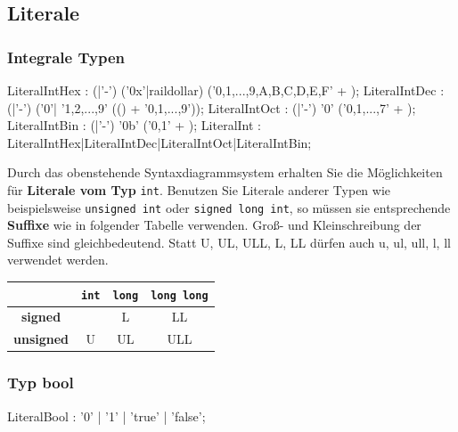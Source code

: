 \documentclass[a4paper]{report}
\begin{document}
\subsection{Literale}

\subsubsection{Integrale Typen}

\begin{center}
\begin{mdframed}[rightmargin=70pt, leftmargin=70pt, linewidth= 0pt]

\begin{rail}
	LiteralIntHex : (|'-') ('0x'|raildollar) ('0,1,...,9,A,B,C,D,E,F' +  );
	LiteralIntDec : (|'-') ('0'| '1,2,...,9' (() + '0,1,...,9'));
	LiteralIntOct : (|'-') '0' ('0,1,...,7' +  );
	LiteralIntBin : (|'-') '0b' ('0,1' +  );
	LiteralInt    : LiteralIntHex|LiteralIntDec|LiteralIntOct|LiteralIntBin;
\end{rail}
\end{mdframed}
\end{center}

Durch das obenstehende Syntaxdiagrammsystem erhalten Sie die Möglichkeiten für \textbf{Literale vom Typ} \texttt{int}. Benutzen Sie Literale anderer Typen wie beispielsweise \texttt{unsigned int} oder \texttt{signed long int}, so müssen sie entsprechende \textbf{Suffixe} wie in folgender Tabelle verwenden. Groß- und Kleinschreibung der Suffixe sind gleichbedeutend. Statt U, UL, ULL, L, LL dürfen auch u, ul, ull, l, ll verwendet werden.

\begin{center}
\begin{tabular}{|c|ccc|}
	\hline
	& 					\texttt{int} &		\texttt{long} &		\texttt{long long} \\ \hline
	\textbf{signed} &	&					L &					LL \\
	\textbf{unsigned}&	U &					UL &				ULL \\ \hline
\end{tabular}
\end{center}

\subsubsection{Typ bool}
\begin{rail}
	LiteralBool : '0' | '1' | 'true' | 'false';
\end{rail}
\end{document}
